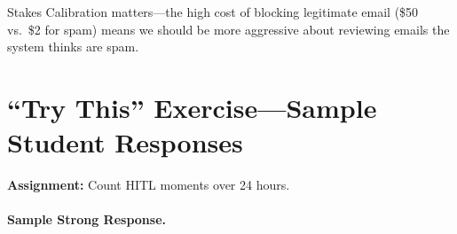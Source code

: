 \begin{keyconcept}
Stakes Calibration matters---the high cost of blocking legitimate email (\$50 vs.\ \$2 for spam) means we should be more aggressive about reviewing emails the system thinks are spam.
\end{keyconcept}

\section{``Try This'' Exercise---Sample Student Responses}

\textbf{Assignment:} Count HITL moments over 24 hours.

\paragraph{Sample Strong Response.}

